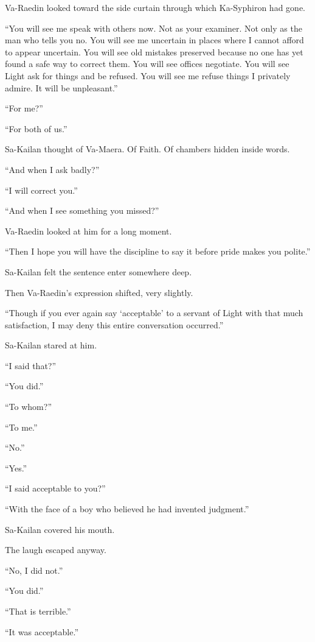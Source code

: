 Va-Raedin looked toward the side curtain through which Ka-Syphiron had gone.\par
“You will see me speak with others now. Not as your examiner. 
Not only as the man who tells you no. 
You will see me uncertain in places where I cannot afford to appear uncertain. 
You will see old mistakes preserved because no one has yet found a safe way to correct them. 
You will see offices negotiate. You will see Light ask for things and be refused. 
You will see me refuse things I privately admire. It will be unpleasant.”\par
“For me?”\par
“For both of us.”\par


Sa-Kailan thought of Va-Maera. Of Faith. Of chambers hidden inside words.\par
“And when I ask badly?”\par
“I will correct you.”\par
“And when I see something you missed?”\par
Va-Raedin looked at him for a long moment.\par
“Then I hope you will have the discipline to say it before pride makes you polite.”\par
Sa-Kailan felt the sentence enter somewhere deep.\par
Then Va-Raedin’s expression shifted, very slightly.\par
“Though if you ever again say ‘acceptable’ to a servant of Light with that much satisfaction, I may deny this entire conversation occurred.”\par
Sa-Kailan stared at him.\par
“I said that?”\par
“You did.”\par
“To whom?”\par
“To me.”\par
“No.”\par
“Yes.”\par
“I said acceptable to you?”\par
“With the face of a boy who believed he had invented judgment.”\par
Sa-Kailan covered his mouth.\par
The laugh escaped anyway.\par
“No, I did not.”\par
“You did.”\par
“That is terrible.”\par
“It was acceptable.”\par
